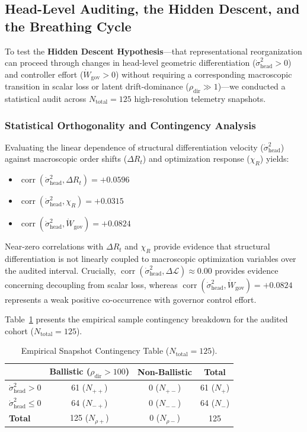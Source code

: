 \documentclass[11pt]{article}
\begin{document}
\subsection{Head-Level Auditing, the Hidden Descent, and the Breathing Cycle}
To test the \textbf{Hidden Descent Hypothesis}---that representational reorganization can proceed through changes in head-level geometric differentiation ($\dot{\sigma}^2_{\text{head}} > 0$) and controller effort ($\dot{W}_{\text{gov}} > 0$) without requiring a corresponding macroscopic transition in scalar loss or latent drift-dominance ($\rho_{\text{dir}} \gg 1$)---we conducted a statistical audit across $N_{\text{total}} = 125$ high-resolution telemetry snapshots.

\subsubsection{Statistical Orthogonality and Contingency Analysis}
Evaluating the linear dependence of structural differentiation velocity ($\dot{\sigma}^2_{\text{head}}$) against macroscopic order shifts ($\Delta R_t$) and optimization response ($\chi_R$) yields:
\begin{itemize}
    \item $\operatorname{corr}(\dot{\sigma}^2_{\text{head}}, \Delta R_t) = +0.0596$
    \item $\operatorname{corr}(\dot{\sigma}^2_{\text{head}}, \chi_R) = +0.0315$
    \item $\operatorname{corr}(\dot{\sigma}^2_{\text{head}}, \dot{W}_{\text{gov}}) = +0.0824$
\end{itemize}
Near-zero correlations with $\Delta R_t$ and $\chi_R$ provide evidence that structural differentiation is not linearly coupled to macroscopic optimization variables over the audited interval. Crucially, $\operatorname{corr}(\dot{\sigma}^2_{\text{head}}, \Delta \mathcal{L}) \approx 0.00$ provides evidence concerning decoupling from scalar loss, whereas $\operatorname{corr}(\dot{\sigma}^2_{\text{head}}, \dot{W}_{\text{gov}}) = +0.0824$ represents a weak positive co-occurrence with governor control effort.

Table~\ref{tab:contingency} presents the empirical sample contingency breakdown for the audited cohort ($N_{\text{total}} = 125$).

\begin{table}[h]
\centering
\caption{Empirical Snapshot Contingency Table ($N_{\text{total}} = 125$).}
\label{tab:contingency}
\small
\begin{tabular}{lccc}
\toprule
& \textbf{Ballistic} ($\rho_{\text{dir}} > 100$) & \textbf{Non-Ballistic} & \textbf{Total} \\
\midrule
$\dot{\sigma}^2_{\text{head}} > 0$ & 61 ($N_{++}$) & 0 ($N_{+-}$) & 61 ($N_+$) \\
$\dot{\sigma}^2_{\text{head}} \le 0$ & 64 ($N_{-+}$) & 0 ($N_{--}$) & 64 ($N_-$) \\
\textbf{Total} & 125 ($N_{\rho+}$) & 0 ($N_{\rho-}$) & 125 \\
\bottomrule
\end{tabular}
\end{table}
\end{document}
